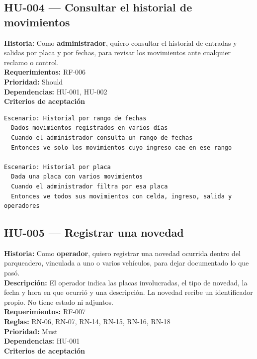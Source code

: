 \subsection{HU-004 — Consultar el historial de movimientos}
\textbf{Historia:} Como \textbf{administrador}, quiero consultar el historial de entradas y salidas por placa y por fechas, para revisar los movimientos ante cualquier reclamo o control.\\
\textbf{Requerimientos:} RF-006\\
\textbf{Prioridad:} Should\\
\textbf{Dependencias:} HU-001, HU-002\\
\textbf{Criterios de aceptación}

\begin{lstlisting}[style=gherkin]
Escenario: Historial por rango de fechas
  Dados movimientos registrados en varios días
  Cuando el administrador consulta un rango de fechas
  Entonces ve solo los movimientos cuyo ingreso cae en ese rango

Escenario: Historial por placa
  Dada una placa con varios movimientos
  Cuando el administrador filtra por esa placa
  Entonces ve todos sus movimientos con celda, ingreso, salida y operadores
\end{lstlisting}

\subsection{HU-005 — Registrar una novedad}
\textbf{Historia:} Como \textbf{operador}, quiero registrar una novedad ocurrida dentro del parqueadero, vinculada a uno o varios vehículos, para dejar documentado lo que pasó.\\
\textbf{Descripción:} El operador indica las placas involucradas, el tipo de novedad, la fecha y hora en que ocurrió y una descripción. La novedad recibe un identificador propio. No tiene estado ni adjuntos.\\
\textbf{Requerimientos:} RF-007\\
\textbf{Reglas:} RN-06, RN-07, RN-14, RN-15, RN-16, RN-18\\
\textbf{Prioridad:} Must\\
\textbf{Dependencias:} HU-001\\
\textbf{Criterios de aceptación}

